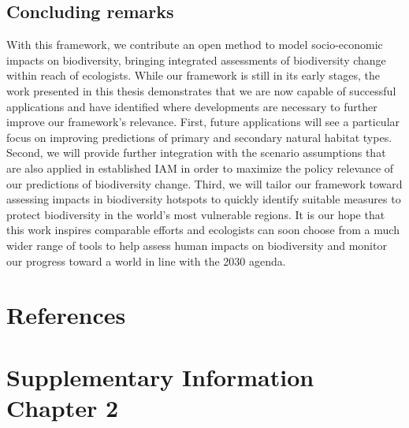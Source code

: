 \documentclass[titlesmallcaps,copyrightpage]{uomthesis}\usepackage[]{graphicx}\usepackage[]{color}
\begin{document}
\section{Concluding remarks}
With this framework, we contribute an open method to model socio-economic impacts on biodiversity, bringing integrated assessments of biodiversity change within reach of ecologists. While our framework is still in its early stages, the work presented in this thesis demonstrates that we are now capable of successful applications and have identified where developments are necessary to further improve our framework's relevance. First, future applications will see a particular focus on improving predictions of primary and secondary natural habitat types. Second, we will provide further integration with the scenario assumptions that are also applied in established IAM in order to maximize the policy relevance of our predictions of biodiversity change. Third, we will tailor our framework toward assessing impacts in biodiversity hotspots to quickly identify suitable measures to protect biodiversity in the world's most vulnerable regions. It is our hope that this work inspires comparable efforts and ecologists can soon choose from a much wider range of tools to help assess human impacts on biodiversity and monitor our progress toward a world in line with the 2030 agenda.

\clearpage{\pagestyle{empty}\cleardoublepage}

{
\backmatter
\chapter{References}

\clearpage{\pagestyle{empty}\cleardoublepage}
}

\let\svaddcontentsline\addcontentsline %
\renewcommand\addcontentsline[3]{%
  \ifthenelse{\equal{#1}{lof}}{}%
  {\ifthenelse{\equal{#1}{lot}}{}{\svaddcontentsline{#1}{#2}{#3}}}}

\clearpage
\appendix
{}
\clearpage{\pagestyle{empty}\cleardoublepage}


\chapter{Supplementary Information Chapter 2}\label{apx:ch2}
\newpage
\end{document}
